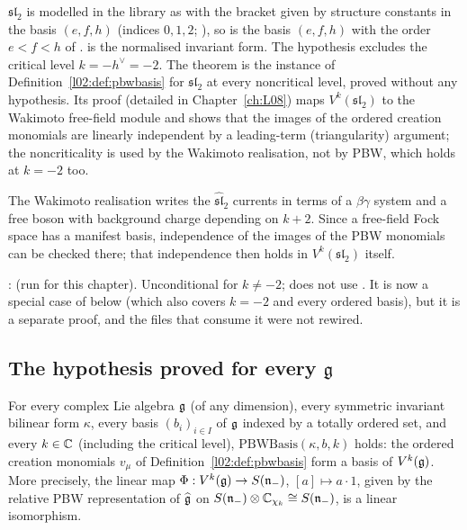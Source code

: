 \begin{dictionary}
$\mathfrak{sl}_2$ is modelled in the library as  with the bracket given by structure
constants in the basis $(e,f,h)$ (indices $0,1,2$; ), so
 is the basis $(e,f,h)$ with the order $e<f<h$ of .
 is the normalised invariant form. The hypothesis  excludes the
critical level $k = -h^\vee = -2$. The theorem is the instance of Definition~\ref{l02:def:pbwbasis} for
$\mathfrak{sl}_2$ at every noncritical level, proved without any hypothesis. Its proof (detailed in
Chapter~\ref{ch:L08}) maps $V^k(\mathfrak{sl}_2)$ to the Wakimoto free-field module and shows that the images
of the ordered creation monomials are linearly independent by a leading-term (triangularity) argument;
the noncriticality is used by the Wakimoto realisation, not by PBW, which holds at $k=-2$ too.
\end{dictionary}

\begin{physics}
The Wakimoto realisation writes the $\widehat{\mathfrak{sl}}_2$ currents in terms of a $\beta\gamma$ system and
a free boson with background charge depending on $k+2$. Since a free-field Fock space has a manifest
basis, independence of the images of the PBW monomials can be checked there; that independence then
holds in $V^k(\mathfrak{sl}_2)$ itself.
\end{physics}

\begin{status}
\allowbreak{}\allowbreak{}\allowbreak{}\allowbreak{}\allowbreak{}:  (run for this chapter). Unconditional for $k\ne-2$; does not use . It is now a
special case of  below (which also covers $k = -2$ and every ordered basis), but it
is a separate proof, and the files that consume it were not rewired.
\end{status}

\subsection{The hypothesis proved for every \texorpdfstring{$\mathfrak g$}{g}}\label{l02:sec:pbwbasisholds}

\begin{theorem}\label{l02:thm:pbwbasisholds}
For every complex Lie algebra $\mathfrak{g}$ (of any dimension), every symmetric invariant bilinear form $\kappa$,
every basis $(b_i)_{i\in I}$ of $\mathfrak{g}$ indexed by a totally ordered set, and every $k\in{\mathbb{C}}$ (including the
critical level), $\mathrm{PBWBasis}(\kappa,b,k)$ holds: the ordered creation monomials $v_\mu$ of
Definition~\ref{l02:def:pbwbasis} form a basis of $V^k(\mathfrak{g})$. More precisely, the linear map
$\Phi : V^k(\mathfrak{g})\to S(\mathfrak{n}_-)$, $[a]\mapsto a\cdot1$, given by the relative PBW representation of
$\widehat{\mathfrak{g}}$ on $S(\mathfrak{n}_-)\otimes{\mathbb{C}}_{\chi_k}\cong S(\mathfrak{n}_-)$, is a linear isomorphism.
\end{theorem}

